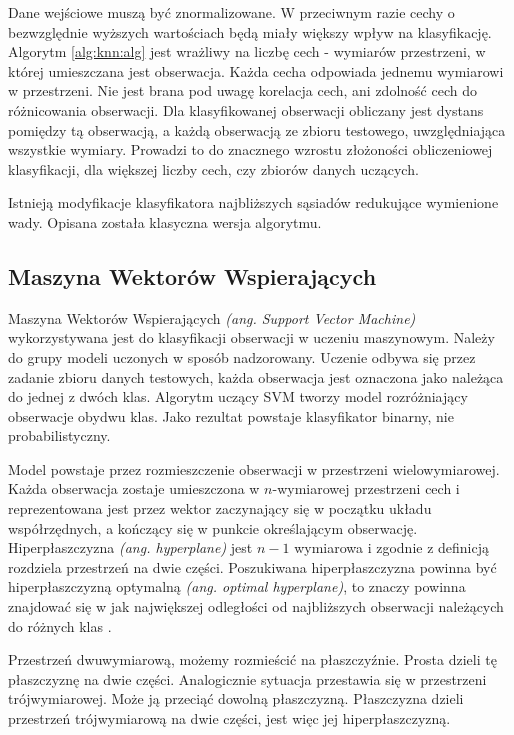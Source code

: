\documentclass[a4paper,12pt,twoside,openany]{report}
\newcommand{\ang}[1]{\textit{(ang. #1)}}
\begin{document}
Dane wejściowe muszą być znormalizowane. 
W przeciwnym razie cechy o bezwzględnie wyższych wartościach będą miały większy wpływ na klasyfikację.
Algorytm \ref{alg:knn:alg} jest wrażliwy na liczbę cech - wymiarów przestrzeni, w której umieszczana jest obserwacja.
Każda cecha odpowiada jednemu wymiarowi w przestrzeni.
Nie jest brana pod uwagę korelacja cech, ani zdolność cech do różnicowania obserwacji.
Dla klasyfikowanej obserwacji obliczany jest dystans pomiędzy tą obserwacją,
a każdą obserwacją ze zbioru testowego, uwzględniająca wszystkie wymiary.
Prowadzi to do znacznego wzrostu złożoności obliczeniowej klasyfikacji, dla większej liczby cech, czy zbiorów danych uczących.

Istnieją modyfikacje klasyfikatora najbliższych sąsiadów redukujące wymienione wady. 
Opisana została klasyczna wersja algorytmu.

\subsection{Maszyna Wektorów Wspierających}

Maszyna Wektorów Wspierających \ang{Support Vector Machine} wykorzystywana jest do klasyfikacji obserwacji w uczeniu maszynowym.
Należy do grupy modeli uczonych w sposób nadzorowany. 
Uczenie odbywa się przez zadanie zbioru danych testowych, 
każda obserwacja jest oznaczona jako należąca do jednej z dwóch klas.
Algorytm uczący SVM tworzy model rozróżniający obserwacje obydwu klas.
Jako rezultat powstaje klasyfikator binarny, nie probabilistyczny. 

Model powstaje przez rozmieszczenie obserwacji w przestrzeni wielowymiarowej.
Każda obserwacja zostaje umieszczona w $n$-wymiarowej przestrzeni cech i reprezentowana jest przez wektor
zaczynający się w początku układu współrzędnych, a kończący się w punkcie określającym obserwację. 
Hiperpłaszczyzna \ang{hyperplane} jest $n-1$ wymiarowa i zgodnie z definicją rozdziela przestrzeń na dwie części.
Poszukiwana hiperpłaszczyzna powinna być hiperpłaszczyzną optymalną \ang{optimal hyperplane}, 
to znaczy powinna znajdować się w jak największej odległości od najbliższych obserwacji należących do różnych klas \cite{Cortes1995}.

Przestrzeń dwuwymiarową, możemy rozmieścić na płaszczyźnie. 
Prosta dzieli tę płaszczyznę na dwie części.
Analogicznie sytuacja przestawia się w przestrzeni trójwymiarowej.
Może ją przeciąć dowolną płaszczyzną.
Płaszczyzna dzieli przestrzeń trójwymiarową na dwie części, jest więc jej hiperpłaszczyzną.
\end{document}
